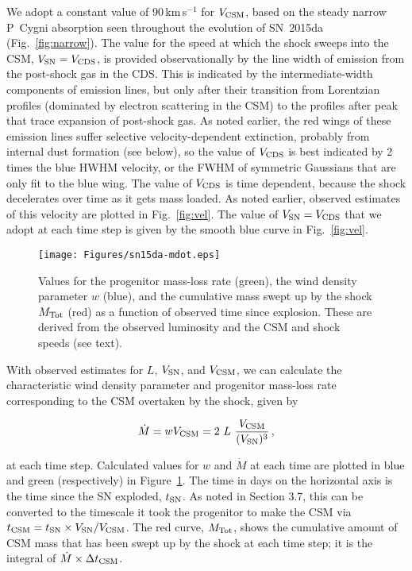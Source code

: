 \documentclass[fleqn,usenatbib,useAMS]{mnras}
\begin{document}
We adopt a constant value of 90\,km\,s$^{-1}$ for $V_{\rm CSM}$, based
on the steady narrow P~Cygni absorption seen throughout the evolution
of SN~2015da (Fig.~\ref{fig:narrow}).  The value for the speed at which the
shock sweeps into the CSM, $V_{\rm SN} = V_{\rm CDS}$, is provided
observationally by the line width of emission from the post-shock gas
in the CDS. This is indicated by the intermediate-width components of
emission lines, but only after their transition from Lorentzian
profiles (dominated by electron scattering in the CSM) to the profiles
after peak that trace expansion of post-shock gas.  As noted earlier, the red wings
of these emission lines suffer selective velocity-dependent
extinction, probably from internal dust formation (see below), so the
value of $V_{\rm CDS}$ is best indicated by 2 times the blue HWHM velocity, or the
FWHM of symmetric Gaussians that are only fit to the blue wing.  The value of
$V_{\rm CDS}$ is time dependent, because the shock decelerates over
time as it gets mass loaded. As noted earlier, observed estimates of
this velocity are plotted in Fig.~\ref{fig:vel}.  The value of
$V_{\rm SN} = V_{\rm CDS}$ that we adopt at each time step is given by
the smooth blue curve in Fig.~\ref{fig:vel}.


\begin{figure}\begin{center}
\texttt{[image: Figures/sn15da-mdot.eps]}
\end{center}
\caption{Values for the progenitor mass-loss rate (green), the wind
  density parameter $w$ (blue), and the cumulative mass swept up by the
  shock $M_{\rm Tot}$ (red) as a function of observed time since explosion.  These are derived from the
  observed luminosity and the CSM and shock speeds (see text).}
\label{fig:mdot}
\end{figure}


With observed estimates for $L$, $V_{\rm SN}$, and $V_{\rm CSM}$, we
can calculate the characteristic wind density parameter and progenitor
mass-loss rate corresponding to the CSM overtaken by the shock, given
by

\begin{equation}
\dot{M} = w V_{\rm CSM} = 2 \ L \ \frac{V_{\rm CSM}}{(V_{\rm SN})^3}\, ,
\end{equation}

\noindent at each time step.  Calculated values for $w$ and $\dot{M}$ at each
time are plotted in blue and green (respectively) in
Figure~\ref{fig:mdot}.  The time in days on the horizontal axis is the
time since the SN exploded, $t_{\rm SN}$.  As noted in Section 3.7,
this can be converted to the timescale it took the progenitor to make
the CSM via $t_{\rm CSM} = t_{\rm SN} \times V_{\rm SN} / V_{\rm
  CSM}$.  The red curve, $M_{\rm Tot}$, shows the cumulative amount of
CSM mass that has been swept up by the shock at each time step; it
is the integral of $\dot{M} \times \Delta t_{\rm CSM}$.
\end{document}
